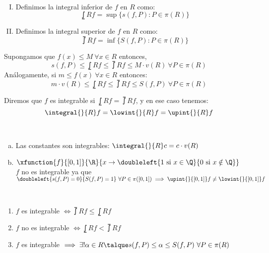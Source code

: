 	\begin{defi}\ 
	\begin{enumerate}[I)]
	\item Definimos la integral	inferior de $f$ en $R$ como:
	\[\lowint{}{R}f=\sup\{s(f,P):P\in\pi(R)\}\]
	\item Definimos la integral	superior de $f$ en $R$ como:
	\[\upint{}{R}f=\inf\{S(f,P):P\in\pi(R)\}\]
	\end{enumerate}
	\end{defi}
	
	\begin{observacion} Supongamos que $f(x)\leq M \ \forall x\in R$ entonces,\\
	\[s(f,P)\leq \lowint{}{R} f\leq \upint{}{R} f\leq M\cdot v(R)\ \forall P\in\pi(R)\]
	Análogamente, si $m\leq f(x)\ \forall x\in R$ entonces:\\
	\[m\cdot v(R)\leq \lowint{}{R}f\leq\upint{}{R}f\leq S(f,P)\ \forall P\in\pi(R)\]
	\end{observacion}
	
	\begin{defi} Diremos que $f$ es integrable si $\lowint{}{R}f=\upint{}{R}f$, y en ese caso tenemos:\\
	\[\integral{}{R}f=\lowint{}{R}f=\upint{}{R}f\]
	\end{defi}
	
	\begin{ejem} \ 
	\begin{enumerate}[a)]
	\item Las constantes son integrables: $\integral{}{R}c=c\cdot v(R)$
	\item $\xfunction{f}{[0,1]}{\R}{x\to\doubleleft{1\ \mathrm{si\ }x\in\Q}{0\ \mathrm{si\ }x\notin \Q}}$\\
	$f$ no es integrable ya que $\doubleleft{s(f,P)=0}{S(f,P)=1}\ \forall P\in \pi([0,1])\implies \upint{}{[0,1]}f\neq\lowint{}{[0,1]}f$
	\end{enumerate}
	\end{ejem}
	
	\begin{observacion}\ 
	\begin{enumerate}[1)]
	\item $f$ es integrable $\iff\upint{}{R}f\leq \lowint{}{R}f$
	\item $f$ no es integrable $\iff \lowint{}{R}f < \upint{}{R}f$
	\item $f$ es integrable $\implies \exists!\alpha\in R\talque s(f,P)\leq\alpha\leq S(f,P)\ \forall P\in\pi(R)$ 
	\end{enumerate}
	\end{observacion}
	
